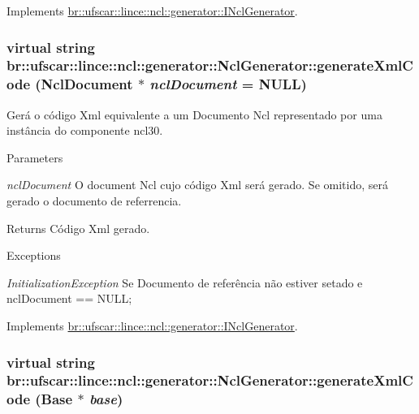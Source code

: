 Implements \hyperlink{classbr_1_1ufscar_1_1lince_1_1ncl_1_1generator_1_1INclGenerator_aa3110ec3a080b9d990c7b02dae573a85}{br::ufscar::lince::ncl::generator::INclGenerator}.

\hypertarget{classbr_1_1ufscar_1_1lince_1_1ncl_1_1generator_1_1NclGenerator_a1d6d619cdde5a146572c0f4a6beeae54}{
\subsubsection[{generateXmlCode}]{\setlength{\rightskip}{0pt plus 5cm}virtual string br::ufscar::lince::ncl::generator::NclGenerator::generateXmlCode (NclDocument $\ast$ {\em nclDocument} = {\ttfamily NULL})}}
\label{classbr_1_1ufscar_1_1lince_1_1ncl_1_1generator_1_1NclGenerator_a1d6d619cdde5a146572c0f4a6beeae54}


Gerá o código Xml equivalente a um Documento Ncl representado por uma instância do componente ncl30. 


\begin{DoxyParams}{Parameters}
\item[{\em nclDocument}]O document Ncl cujo código Xml será gerado. Se omitido, será gerado o documento de referrencia. \end{DoxyParams}
\begin{DoxyReturn}{Returns}
Código Xml gerado. 
\end{DoxyReturn}

\begin{DoxyExceptions}{Exceptions}
\item[{\em InitializationException}]Se Documento de referência não estiver setado e nclDocument == NULL; \end{DoxyExceptions}


Implements \hyperlink{classbr_1_1ufscar_1_1lince_1_1ncl_1_1generator_1_1INclGenerator_a396181e0d4b4d7e53addd5a25ffa839b}{br::ufscar::lince::ncl::generator::INclGenerator}.

\hypertarget{classbr_1_1ufscar_1_1lince_1_1ncl_1_1generator_1_1NclGenerator_aae7b4842e72b88deb5c5a303a77c7cab}{
\subsubsection[{generateXmlCode}]{\setlength{\rightskip}{0pt plus 5cm}virtual string br::ufscar::lince::ncl::generator::NclGenerator::generateXmlCode (Base $\ast$ {\em base})}}
\label{classbr_1_1ufscar_1_1lince_1_1ncl_1_1generator_1_1NclGenerator_aae7b4842e72b88deb5c5a303a77c7cab}


